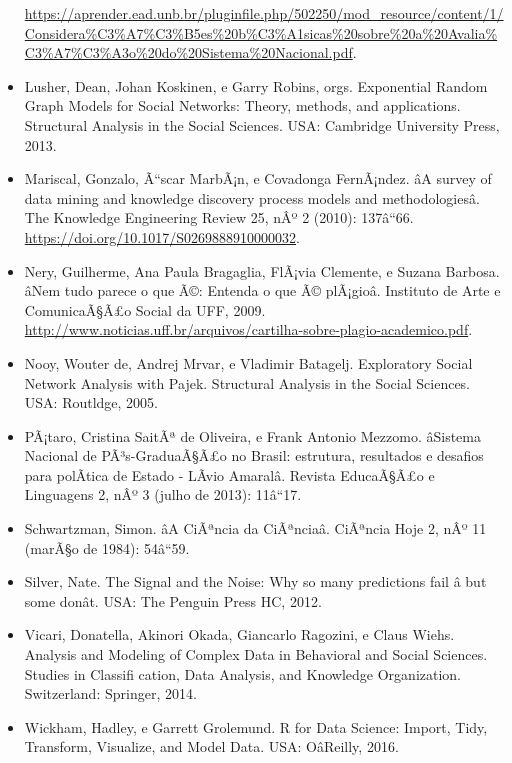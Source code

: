 \documentclass[]{article}
\begin{document}
\begin{itemize}
  \url{https://aprender.ead.unb.br/pluginfile.php/502250/mod_resource/content/1/Considera\%C3\%A7\%C3\%B5es\%20b\%C3\%A1sicas\%20sobre\%20a\%20Avalia\%C3\%A7\%C3\%A3o\%20do\%20Sistema\%20Nacional.pdf}.
\item
  Lusher, Dean, Johan Koskinen, e Garry Robins, orgs. Exponential Random
  Graph Models for Social Networks: Theory, methods, and applications.
  Structural Analysis in the Social Sciences. USA: Cambridge University
  Press, 2013.
\item
  Mariscal, Gonzalo, Ã``scar MarbÃ¡n, e Covadonga FernÃ¡ndez. âA
  survey of data mining and knowledge discovery process models and
  methodologiesâ. The Knowledge Engineering Review 25, nÂº 2 (2010):
  137â``66. \url{https://doi.org/10.1017/S0269888910000032}.
\item
  Nery, Guilherme, Ana Paula Bragaglia, FlÃ¡via Clemente, e Suzana
  Barbosa. âNem tudo parece o que Ã©: Entenda o que Ã© plÃ¡gioâ.
  Instituto de Arte e ComunicaÃ§Ã£o Social da UFF, 2009.
  \url{http://www.noticias.uff.br/arquivos/cartilha-sobre-plagio-academico.pdf}.
\item
  Nooy, Wouter de, Andrej Mrvar, e Vladimir Batagelj. Exploratory Social
  Network Analysis with Pajek. Structural Analysis in the Social
  Sciences. USA: Routldge, 2005.
\item
  PÃ¡taro, Cristina SaitÃª de Oliveira, e Frank Antonio Mezzomo.
  âSistema Nacional de PÃ³s-GraduaÃ§Ã£o no Brasil: estrutura,
  resultados e desafios para polÃ­tica de Estado - LÃ­vio Amaralâ.
  Revista EducaÃ§Ã£o e Linguagens 2, nÂº 3 (julho de 2013): 11â``17.
\item
  Schwartzman, Simon. âA CiÃªncia da CiÃªnciaâ. CiÃªncia Hoje 2, nÂº
  11 (marÃ§o de 1984): 54â``59.
\item
  Silver, Nate. The Signal and the Noise: Why so many predictions fail
  â but some donât. USA: The Penguin Press HC, 2012.
\item
  Vicari, Donatella, Akinori Okada, Giancarlo Ragozini, e Claus Wiehs.
  Analysis and Modeling of Complex Data in Behavioral and Social
  Sciences. Studies in Classifi cation, Data Analysis, and Knowledge
  Organization. Switzerland: Springer, 2014.
\item
  Wickham, Hadley, e Garrett Grolemund. R for Data Science: Import,
  Tidy, Transform, Visualize, and Model Data. USA: OâReilly, 2016.
\end{itemize}
\end{document}
